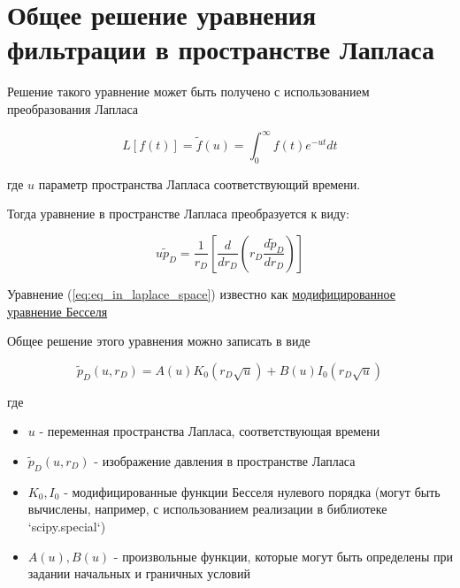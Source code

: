 \section{Общее решение уравнения фильтрации в пространстве Лапласа}

Решение такого уравнение может быть получено с использованием преобразования Лапласа

\begin{equation}  \label{eq:laplace_eq_1}
L \left [ f(t) \right] = \tilde{f}(u) = \int_{0}^{\infty}f(t)e^{-ut}dt 
\end{equation}

где $u$ параметр пространства Лапласа соответствующий времени.

Тогда уравнение в пространстве Лапласа преобразуется к виду:

\begin{equation}  \label{eq:eq_in_laplace_space} 
u \tilde{p}_D  =  \dfrac{1}{r_D} \left[\dfrac{d}{d r_D} \left(r_D \dfrac{d{\tilde{p}_D}}{d r_D} \right) \right] 
\end{equation}

Уравнение (\ref{eq:eq_in_laplace_space}) известно как \href{href="https://ru.wikipedia.org/wiki/%D0%9C%D0%BE%D0%B4%D0%B8%D1%84%D0%B8%D1%86%D0%B8%D1%80%D0%BE%D0%B2%D0%B0%D0%BD%D0%BD%D1%8B%D0%B5_%D1%84%D1%83%D0%BD%D0%BA%D1%86%D0%B8%D0%B8_%D0%91%D0%B5%D1%81%D1%81%D0%B5%D0%BB%D1%8F"}{модифицированное уравнение Бесселя}  

Общее решение этого уравнения можно записать в виде 

\begin{equation} 
\tilde{p}_D(u, r_D) = A(u) K_0(r_D \sqrt u) + B(u) I_0(r_D \sqrt u) 
\end{equation}

где 
\begin{itemize}
	\item $u$ - переменная пространства Лапласа, соответствующая времени
	\item $\tilde{p}_D(u, r_D)$ - изображение давления в пространстве Лапласа
	\item $K_0, I_0$ - модифицированные функции Бесселя нулевого порядка (могут быть вычислены, например, с использованием реализации в библиотеке `scipy.special`)
	\item $A(u), B(u)$ - произвольные функции, которые могут быть определены при задании начальных и граничных условий
	
\end{itemize}


